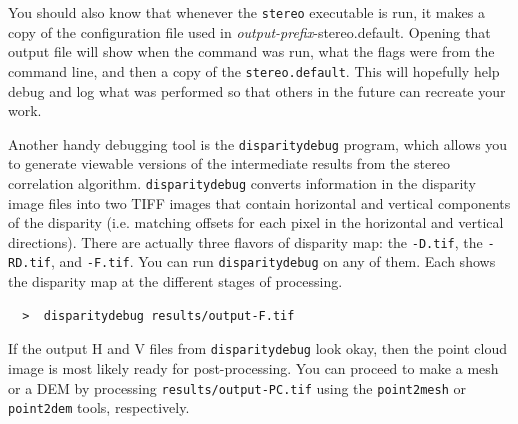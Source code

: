 You should also know that whenever the \texttt{stereo} executable is
run, it makes a copy of the configuration file used in
\textit{output-prefix}-stereo.default. Opening that output file will
show when the command was run, what the flags were from the command
line, and then a copy of the \texttt{stereo.default}. This will
hopefully help debug and log what was performed so that others in the
future can recreate your work.

Another handy debugging tool is the \texttt{disparitydebug} program,
which allows you to generate viewable versions of the intermediate
results from the stereo correlation algorithm.
\texttt{disparitydebug} converts information in the disparity image
files into two TIFF images that contain horizontal and vertical
components of the disparity (i.e. matching offsets for each pixel in
the horizontal and vertical directions).  There are actually three
flavors of disparity map: the \texttt{-D.tif}, the \texttt{-RD.tif},
and \texttt{-F.tif}.  You can run \texttt{disparitydebug} on any of
them.  Each shows the disparity map at the different stages of
processing.

\begin{verbatim}
  >  disparitydebug results/output-F.tif
\end{verbatim}

If the output H and V files from \texttt{disparitydebug} look okay,
then the point cloud image is most likely ready for post-processing.
You can proceed to make a mesh or a \ac{DEM} by processing
\texttt{results/output-PC.tif} using the \texttt{point2mesh} or
\texttt{point2dem} tools, respectively.

